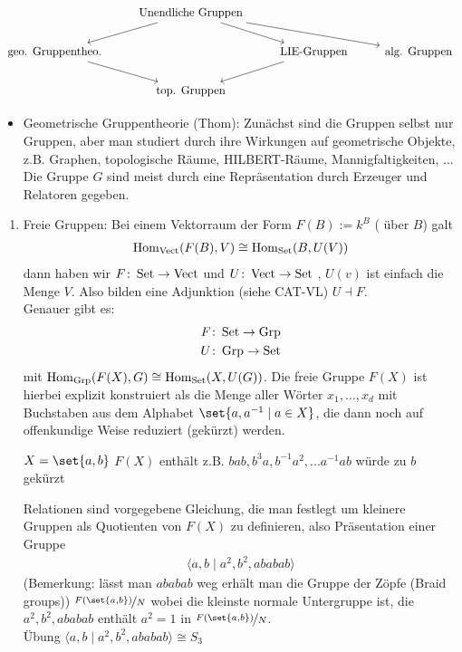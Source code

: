\[
	\begin{tikzcd}
		& \text{Unendliche Gruppen} \arrow[rrd] \arrow[rd] \arrow[ld] &                               &                     \\
		\text{geo. Gruppentheo.} \arrow[rd] &                                                             & \text{LIE-Gruppen} \arrow[ld] & \text{alg. Gruppen} \\
		& \text{top. Gruppen}                                         &                               &                    
	\end{tikzcd}
\]
\begin{itemize}
	\item Geometrische Gruppentheorie (Thom): Zunächst sind die Gruppen selbst nur Gruppen, aber man studiert durch ihre Wirkungen auf geometrische Objekte, z.B. Graphen, topologische Räume, HILBERT-Räume, Mannigfaltigkeiten, ... \\
	Die Gruppe $G$ sind meist durch eine Repräsentation durch Erzeuger und Relatoren gegeben.
\end{itemize}
\begin{enumerate}
	\item Freie Gruppen: Bei einem Vektorraum der Form $F(B):= k^B$ ( über $B$) galt
	\begin{align*}
		\operatorname{Hom}_{\operatorname{Vect}}(F(B),V) \cong \operatorname{Hom}_{\operatorname{Set}}(B,U(V))
	\end{align*}
	dann haben wir $F \colon \operatorname{Set} \to \operatorname{Vect}$  und $U \colon \operatorname{Vect} \to \operatorname{Set}$ , $U(v)$ ist einfach die Menge $V$. Also bilden eine Adjunktion (siehe CAT-VL) $U \dashv F$.\\
	Genauer gibt es:
	\begin{align*}
		F\colon \operatorname{Set} \to \operatorname{Grp}\\
		U \colon \operatorname{Grp} \to \operatorname{Set}
	\end{align*}
	mit $\operatorname{Hom}_{\operatorname{Grp}}(F(X),G) \cong \operatorname{Hom}_{\operatorname{Set}}(X,U(G))$. Die freie Gruppe $F(X)$ ist hierbei explizit konstruiert als die Menge aller Wörter $x_1, \dots, x_d$ mit Buchstaben aus dem Alphabet $\set{a,a^{-1}\mid a \in X}$, die dann noch auf offenkundige Weise reduziert (gekürzt) werden.
	\begin{*example}
		$X = \set{a,b}$ $F(X)$ enthält z.B. $bab, b^3a, b^{-1}a^2, ... a^{-1}ab$ würde zu $b$ gekürzt
	\end{*example}
	Relationen sind vorgegebene Gleichung, die man festlegt um kleinere Gruppen als Quotienten von $F(X)$ zu definieren, also Präsentation einer Gruppe
	\begin{align*}
		\langle a,b \mid a^2, b^2, ababab\rangle
	\end{align*}
	(Bemerkung: lässt man $ababab$ weg erhält man die Gruppe der Zöpfe (Braid groups))
	$\lnkset{F(\set{a,b})}{N}$ wobei die kleinste normale Untergruppe ist, die $a^2,b^2,ababab$ enthält $a^2 = 1$ in $\lnkset{F(\set{a,b})}{N}$.\\
	Übung $\langle a,b \mid a^2, b^2, ababab\rangle \cong S_3$
\end{enumerate}